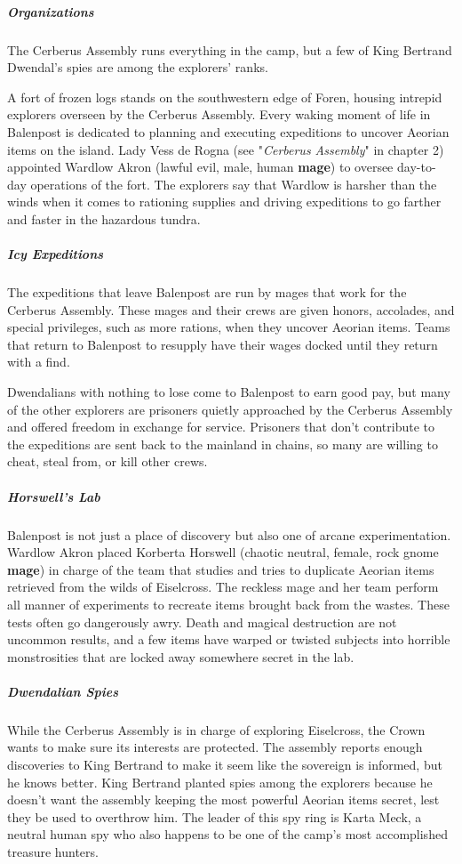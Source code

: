 \documentclass[10pt,a4paper,twoside,bg=print,twocolumn,openany,nodeprecatedcode]{dndbook}
\begin{document}
\subparagraph{Organizations}
The Cerberus Assembly runs everything in the camp, but a few of King Bertrand Dwendal's spies are among the explorers' ranks.

A fort of frozen logs stands on the southwestern edge of Foren, housing intrepid explorers overseen by the Cerberus Assembly. Every waking moment of life in Balenpost is dedicated to planning and executing expeditions to uncover Aeorian items on the island. Lady Vess de Rogna (see "\textit{Cerberus Assembly}" in chapter 2) appointed Wardlow Akron (lawful evil, male, human \textbf{mage}) to oversee day-to-day operations of the fort. The explorers say that Wardlow is harsher than the winds when it comes to rationing supplies and driving expeditions to go farther and faster in the hazardous tundra.

\subparagraph{Icy Expeditions}
The expeditions that leave Balenpost are run by mages that work for the Cerberus Assembly. These mages and their crews are given honors, accolades, and special privileges, such as more rations, when they uncover Aeorian items. Teams that return to Balenpost to resupply have their wages docked until they return with a find.

Dwendalians with nothing to lose come to Balenpost to earn good pay, but many of the other explorers are prisoners quietly approached by the Cerberus Assembly and offered freedom in exchange for service. Prisoners that don't contribute to the expeditions are sent back to the mainland in chains, so many are willing to cheat, steal from, or kill other crews.

\subparagraph{Horswell's Lab}
Balenpost is not just a place of discovery but also one of arcane experimentation. Wardlow Akron placed Korberta Horswell (chaotic neutral, female, rock gnome \textbf{mage}) in charge of the team that studies and tries to duplicate Aeorian items retrieved from the wilds of Eiselcross. The reckless mage and her team perform all manner of experiments to recreate items brought back from the wastes. These tests often go dangerously awry. Death and magical destruction are not uncommon results, and a few items have warped or twisted subjects into horrible monstrosities that are locked away somewhere secret in the lab.

\subparagraph{Dwendalian Spies}
While the Cerberus Assembly is in charge of exploring Eiselcross, the Crown wants to make sure its interests are protected. The assembly reports enough discoveries to King Bertrand to make it seem like the sovereign is informed, but he knows better. King Bertrand planted spies among the explorers because he doesn't want the assembly keeping the most powerful Aeorian items secret, lest they be used to overthrow him. The leader of this spy ring is Karta Meck, a neutral human spy who also happens to be one of the camp's most accomplished treasure hunters.
\end{document}

